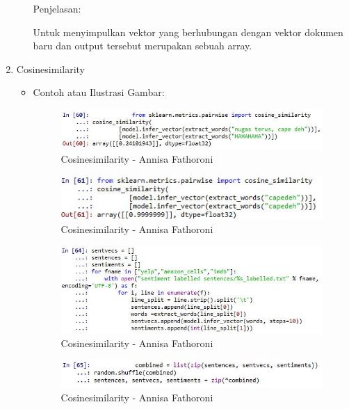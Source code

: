 \begin{enumerate}
\begin{itemize}
Penjelasan:

Untuk menyimpulkan vektor yang berhubungan dengan vektor dokumen baru dan output tersebut merupakan sebuah array.

\end{itemize}

\item Cosinesimilarity
\begin{itemize}
\item Contoh atau Ilustrasi Gambar:

\begin{figure}[!hbtp]
\centering
\includegraphics[scale=0.7]{figures/Chapter5AnnisaFathoroni52.jpg}
\caption{Cosinesimilarity - Annisa Fathoroni}
\label{Cosinesimilarity - Annisa Fathoroni}
\end{figure}

\begin{figure}[!hbtp]
\centering
\includegraphics[scale=0.7]{figures/Chapter5AnnisaFathoroni53.jpg}
\caption{Cosinesimilarity - Annisa Fathoroni}
\label{Cosinesimilarity - Annisa Fathoroni}
\end{figure}

\begin{figure}[!hbtp]
\centering
\includegraphics[scale=0.7]{figures/Chapter5AnnisaFathoroni54.jpg}
\caption{Cosinesimilarity - Annisa Fathoroni}
\label{Cosinesimilarity - Annisa Fathoroni}
\end{figure}

\begin{figure}[!hbtp]
\centering
\includegraphics[scale=0.7]{figures/Chapter5AnnisaFathoroni55.jpg}
\caption{Cosinesimilarity - Annisa Fathoroni}
\label{Cosinesimilarity - Annisa Fathoroni}
\end{figure}


\end{itemize}
\end{enumerate}

